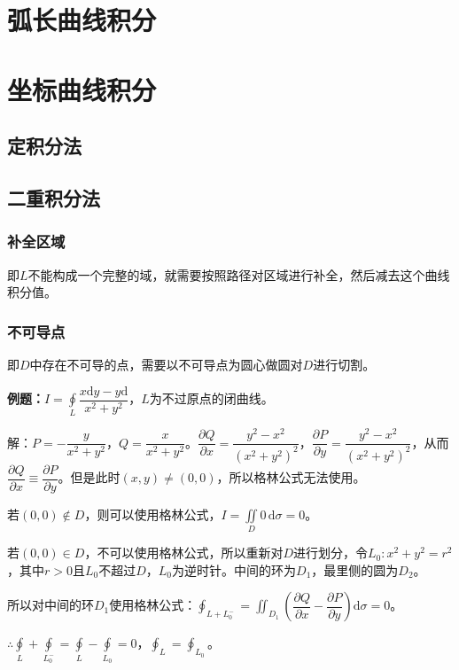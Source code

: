 \documentclass[UTF8, 12pt]{ctexart}
\begin{document}
\section{弧长曲线积分}

\section{坐标曲线积分}

\subsection{定积分法}

\subsection{二重积分法}

\subsubsection{补全区域}

即$L$不能构成一个完整的域，就需要按照路径对区域进行补全，然后减去这个曲线积分值。

\subsubsection{不可导点}

即$D$中存在不可导的点，需要以不可导点为圆心做圆对$D$进行切割。

\textbf{例题：}$I=\displaystyle{\oint\limits_L\dfrac{x\textrm{d}y-y\textrm{d}}{x^2+y^2}}$，$L$为不过原点的闭曲线。

解：$P=-\dfrac{y}{x^2+y^2}$，$Q=\dfrac{x}{x^2+y^2}$。$\dfrac{\partial Q}{\partial x}=\dfrac{y^2-x^2}{(x^2+y^2)^2}$，$\dfrac{\partial P}{\partial y}=\dfrac{y^2-x^2}{(x^2+y^2)^2}$，从而$\dfrac{\partial Q}{\partial x}\equiv\dfrac{\partial P}{\partial y}$。但是此时$(x,y)\neq(0,0)$，所以格林公式无法使用。

若$(0,0)\notin D$，则可以使用格林公式，$I=\iint\limits_D0\,\textrm{d}\sigma=0$。

若$(0,0)\in D$，不可以使用格林公式，所以重新对$D$进行划分，令$L_0:x^2+y^2=r^2$，其中$r>0$且$L_0$不超过$D$，$L_0$为逆时针。中间的环为$D_1$，最里侧的圆为$D_2$。

所以对中间的环$D_1$使用格林公式：$\oint_{L+L_0^-}=\iint_{D_1}\left(\dfrac{\partial Q}{\partial x}-\dfrac{\partial P}{\partial y}\right)\textrm{d}\sigma=0$。

$\therefore\oint\limits_L+\oint\limits_{L_0^-}=\oint\limits_L-\oint\limits_{L_0}=0$，$\oint_L=\oint_{L_0}$。
\end{document}
